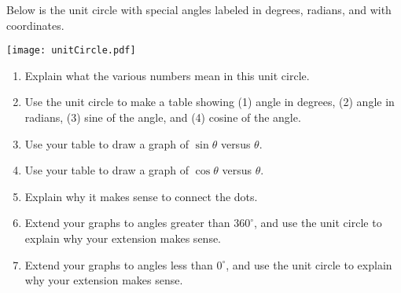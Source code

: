 \documentclass[nooutcomes]{ximera}
\begin{document}
\begin{problem}
Below is the unit circle with special angles labeled in degrees, radians, and with 
coordinates.
\begin{image}
\texttt{[image: unitCircle.pdf]}
\end{image}
\begin{enumerate}
\item Explain what the various numbers mean in this unit circle.  
\item Use the unit circle to make a table showing (1) angle in degrees, (2) angle in radians, (3) sine of the angle, and (4) cosine of the angle.  
\item Use your table to draw a graph of $\sin\theta$ versus $\theta$.
\item Use your table to draw a graph of $\cos\theta$ versus $\theta$.
\item Explain why it makes sense to connect the dots. 
\item Extend your graphs to angles greater than $360^\circ$, and use the unit circle to explain why your extension makes sense. 
\item Extend your graphs to angles less than $0^\circ$, and use the unit circle to explain why your extension makes sense.
\end{enumerate}
\end{problem}

%
%
%

\end{document}
